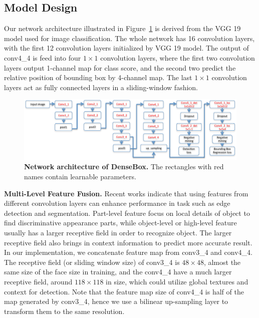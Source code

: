 \subsection{Model Design } 

Our network architecture illustrated in Figure~\ref{fig:fig_net} is derived from the VGG 19 model used for image classification\cite{simonyan2014very}. The whole network has 16 convolution layers, with the first 12 convolution layers initialized by VGG 19 model.  The output of conv4\_4 is feed into four $1 \times 1$ convolution layers, where the first two convolution layers output 1-channel map for class score, and the second two predict the relative position of bounding box by 4-channel map.  The last $1 \times 1$ convolution layers act as fully connected layers in a sliding-window fashion.  


	\begin{figure}[!hbtp]
	\centering
	 \includegraphics[scale=0.55]{figures/figure3-crop.pdf}
	\caption{\textbf{Network architecture of DenseBox.} The rectangles with red names contain learnable parameters. }
	\label{fig:fig_net}
	\end{figure}



\textbf{Multi-Level Feature Fusion.} 
Recent works\cite{bertasius2014deepedge, liu2015parsenet} indicate that using features from different convolution layers can enhance performance in task such as edge detection and segmentation. Part-level feature focus on local details of object to find discriminative appearance parts, while object-level or high-level feature usually has a larger receptive field in order to recognize object. The larger receptive field also brings in context information to predict more accurate result. In our implementation, we concatenate feature map from conv3\_4 and conv4\_4. The receptive field (or sliding window size) of conv3\_4 is $48 \times 48$, almost the same size of the face size in training, and the conv4\_4 have a much larger receptive field, around $118 \times 118$ in size, which could utilize global textures and context for detection.  Note that the feature map size of conv4\_4 is half of the map generated by conv3\_4, hence we use a bilinear up-sampling layer to transform them to the same resolution. 

